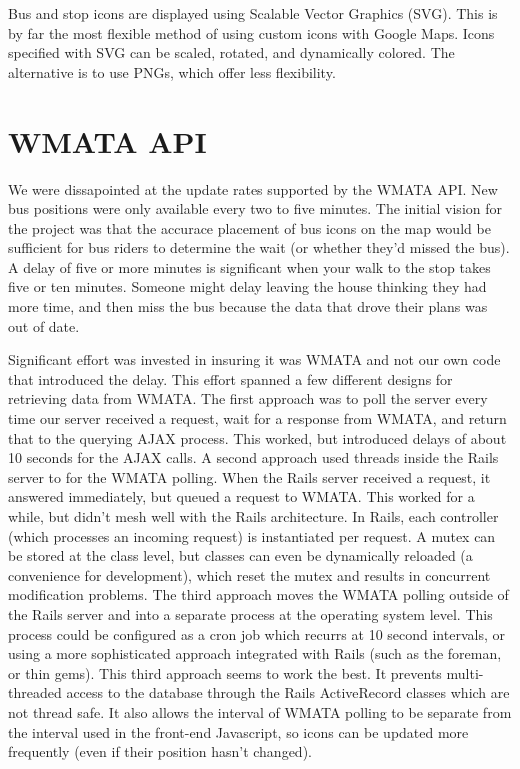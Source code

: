 \documentclass[12pt]{report}
\begin{document}
Bus and stop icons are displayed using Scalable Vector Graphics (SVG).  This is by far the most flexible method of using custom icons with Google Maps.  Icons specified with SVG can be scaled, rotated, and dynamically colored.  The alternative is to use PNGs, which offer less flexibility.

\section{WMATA API}

We were dissapointed at the update rates supported by the WMATA API.  New bus positions were only available every two to five minutes.  The initial vision for the project was that the accurace placement of bus icons on the map would be sufficient for bus riders to determine the wait (or whether they'd missed the bus).  A delay of five or more minutes is significant when your walk to the stop takes five or ten minutes.  Someone might delay leaving the house thinking they had more time, and then miss the bus because the data that drove their plans was out of date.  

Significant effort was invested in insuring it was WMATA and not our own code that introduced the delay.  This effort spanned a few different designs for retrieving data from WMATA.  The first approach was to poll the server every time our server received a request, wait for a response from WMATA, and return that to the querying AJAX process.  This worked, but introduced delays of about 10 seconds for the AJAX calls.  A second approach used threads inside the Rails server to for the WMATA polling.  When the Rails server received a request, it answered immediately, but queued a request to WMATA.  This worked for a while, but didn't mesh well with the Rails architecture.  In Rails, each controller (which processes an incoming request) is instantiated per request.  A mutex can be stored at the class level, but classes can even be dynamically reloaded (a convenience for development), which reset the mutex and results in concurrent modification problems.  The third approach moves the WMATA polling outside of the Rails server and into a separate process at the operating system level.  This process could be configured as a cron job which recurrs at 10 second intervals, or using a more sophisticated approach integrated with Rails (such as the foreman, or thin gems).  This third approach seems to work the best.  It prevents multi-threaded access to the database through the Rails ActiveRecord classes which are not thread safe.  It also allows the interval of WMATA polling to be separate from the interval used in the front-end Javascript, so icons can be updated more frequently (even if their position hasn't changed).
\end{document}

